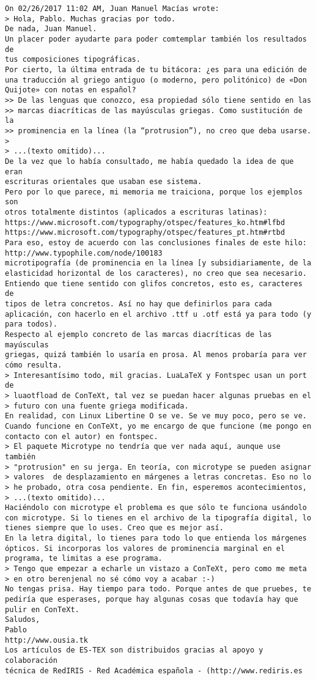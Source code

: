 \documentclass[a4paper,10pt]{article}
\begin{document}
\begin{lstlisting}
On 02/26/2017 11:02 AM, Juan Manuel Macías wrote:
> Hola, Pablo. Muchas gracias por todo.
De nada, Juan Manuel.
Un placer poder ayudarte para poder comtemplar también los resultados de
tus composiciones tipográficas.
Por cierto, la última entrada de tu bitácora: ¿es para una edición de
una traducción al griego antiguo (o moderno, pero politónico) de «Don
Quijote» con notas en español?
>> De las lenguas que conozco, esa propiedad sólo tiene sentido en las
>> marcas diacríticas de las mayúsculas griegas. Como sustitución de la
>> prominencia en la línea (la “protrusion”), no creo que deba usarse.
> 
> ...(texto omitido)...
De la vez que lo había consultado, me había quedado la idea de que eran
escrituras orientales que usaban ese sistema.
Pero por lo que parece, mi memoria me traiciona, porque los ejemplos son
otros totalmente distintos (aplicados a escrituras latinas):
https://www.microsoft.com/typography/otspec/features_ko.htm#lfbd
https://www.microsoft.com/typography/otspec/features_pt.htm#rtbd
Para eso, estoy de acuerdo con las conclusiones finales de este hilo:
http://www.typophile.com/node/100183
microtipografía (de prominencia en la línea [y subsidiariamente, de la
elasticidad horizontal de los caracteres), no creo que sea necesario.
Entiendo que tiene sentido con glifos concretos, esto es, caracteres de
tipos de letra concretos. Así no hay que definirlos para cada
aplicación, con hacerlo en el archivo .ttf u .otf está ya para todo (y
para todos).
Respecto al ejemplo concreto de las marcas diacríticas de las mayúsculas
griegas, quizá también lo usaría en prosa. Al menos probaría para ver
cómo resulta.
> Interesantísimo todo, mil gracias. LuaLaTeX y Fontspec usan un port de
> luaotfload de ConTeXt, tal vez se puedan hacer algunas pruebas en el
> futuro con una fuente griega modificada.
En realidad, con Linux Libertine O se ve. Se ve muy poco, pero se ve.
Cuando funcione en ConTeXt, yo me encargo de que funcione (me pongo en
contacto con el autor) en fontspec.
> El paquete Microtype no tendría que ver nada aquí, aunque use también
> "protrusion" en su jerga. En teoría, con microtype se pueden asignar
> valores  de desplazamiento en márgenes a letras concretas. Eso no lo
> he probado, otra cosa pendiente. En fin, esperemos acontecimientos,
> ...(texto omitido)...
Haciéndolo con microtype el problema es que sólo te funciona usándolo
con microtype. Si lo tienes en el archivo de la tipografía digital, lo
tienes siempre que lo uses. Creo que es mejor así.
En la letra digital, lo tienes para todo lo que entienda los márgenes
ópticos. Si incorporas los valores de prominencia marginal en el
programa, te limitas a ese programa.
> Tengo que empezar a echarle un vistazo a ConTeXt, pero como me meta
> en otro berenjenal no sé cómo voy a acabar :-)
No tengas prisa. Hay tiempo para todo. Porque antes de que pruebes, te
pediría que esperases, porque hay algunas cosas que todavía hay que
pulir en ConTeXt.
Saludos,
Pablo
http://www.ousia.tk
Los artículos de ES-TEX son distribuidos gracias al apoyo y colaboración 
técnica de RedIRIS - Red Académica española - (http://www.rediris.es

\end{lstlisting}
\end{document}
